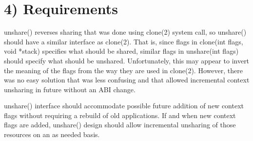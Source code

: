 \documentclass[a4paper,8pt,english]{sphinxmanual}
\begin{document}
\section{4) Requirements}
\label{userspace-api/unshare:requirements}
unshare() reverses sharing that was done using clone(2) system call,
so unshare() should have a similar interface as clone(2). That is,
since flags in clone(int flags, void *stack) specifies what should
be shared, similar flags in unshare(int flags) should specify
what should be unshared. Unfortunately, this may appear to invert
the meaning of the flags from the way they are used in clone(2).
However, there was no easy solution that was less confusing and that
allowed incremental context unsharing in future without an ABI change.

unshare() interface should accommodate possible future addition of
new context flags without requiring a rebuild of old applications.
If and when new context flags are added, unshare() design should allow
incremental unsharing of those resources on an as needed basis.
\end{document}

